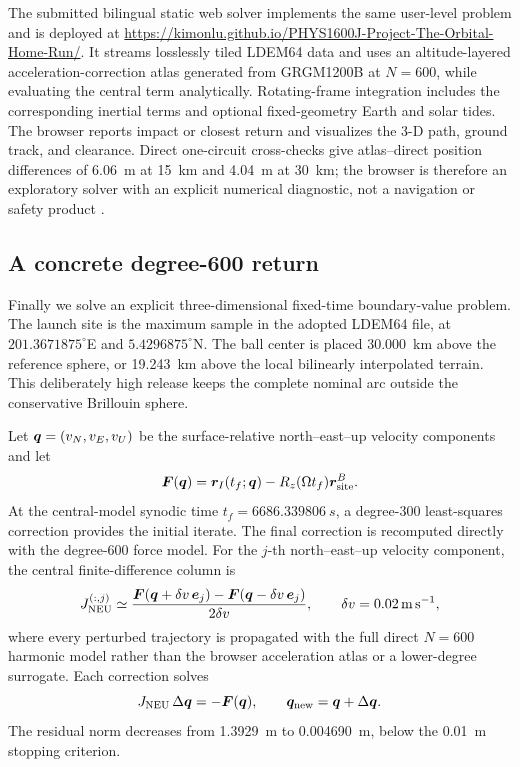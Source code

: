 The submitted bilingual static web solver implements the same user-level problem and is deployed at \url{https://kimonlu.github.io/PHYS1600J-Project-The-Orbital-Home-Run/}. It streams losslessly tiled LDEM64 data and uses an altitude-layered acceleration-correction atlas generated from GRGM1200B at \(N=600\), while evaluating the central term analytically. Rotating-frame integration includes the corresponding inertial terms and optional fixed-geometry Earth and solar tides. The browser reports impact or closest return and visualizes the 3-D path, ground track, and clearance. Direct one-circuit cross-checks give atlas--direct position differences of \SI{6.06}{m} at \SI{15}{km} and \SI{4.04}{m} at \SI{30}{km}; the browser is therefore an exploratory solver with an explicit numerical diagnostic, not a navigation or safety product \cite{ProjectRepository,WebSolver}.

\subsection{A concrete degree-600 return}

Finally we solve an explicit three-dimensional fixed-time boundary-value problem. The launch site is the maximum sample in the adopted LDEM64 file, at \(201.3671875^\circ\)E and \(5.4296875^\circ\)N. The ball center is placed \SI{30.000}{km} above the reference sphere, or \SI{19.243}{km} above the local bilinearly interpolated terrain. This deliberately high release keeps the complete nominal arc outside the conservative Brillouin sphere.

Let \(\bm{q}=(v_N,v_E,v_U)\) be the surface-relative north--east--up velocity components and let
\begin{equation}
 \bm{F}(\bm{q})=\bm{r}_I(t_f;\bm{q})-R_z(\Omega t_f)\bm{r}_{\rm site}^{B}.
 \label{eq:bvp_residual}
\end{equation}
At the central-model synodic time
\(t_f=\SI{6686.339806}{s}\), a degree-300 least-squares correction
provides the initial iterate. The final correction is recomputed directly
with the degree-600 force model. For the \(j\)-th north--east--up velocity
component, the central finite-difference column is
\begin{equation}
 J_{\rm NEU}^{(:,j)}
 \simeq
 \frac{\bm{F}(\bm{q}+\delta v\,\bm{e}_j)
       -\bm{F}(\bm{q}-\delta v\,\bm{e}_j)}
      {2\delta v},
 \qquad
 \delta v=\SI{0.02}{\metre\per\second},
 \label{eq:direct_jacobian}
\end{equation}
where every perturbed trajectory is propagated with the full direct
\(N=600\) harmonic model rather than the browser acceleration atlas or a
lower-degree surrogate. Each correction solves
\begin{equation}
 J_{\rm NEU}\,\Delta\bm{q}=-\bm{F}(\bm{q}),
 \qquad
 \bm{q}_{\rm new}=\bm{q}+\Delta\bm{q}.
 \label{eq:newton_correction}
\end{equation}
The residual norm decreases from \SI{1.3929}{m} to
\SI{0.004690}{m}, below the \SI{0.01}{m} stopping criterion.


